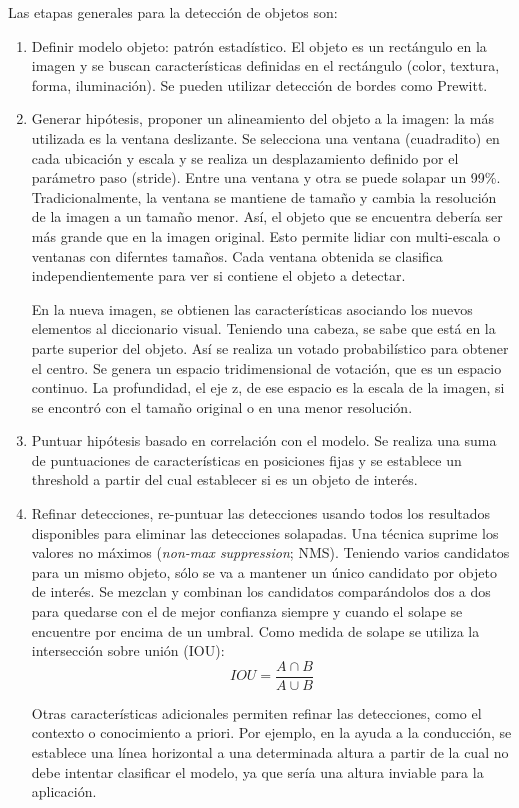 Las etapas generales para la detección de objetos son:
\begin{enumerate}
\item Definir modelo objeto: patrón estadístico. El objeto es un rectángulo en la imagen y se buscan características definidas en el rectángulo (color, textura, forma, iluminación). Se pueden utilizar detección de bordes como Prewitt.

\item Generar hipótesis, proponer un alineamiento del objeto a la imagen: la más utilizada es la ventana deslizante. Se selecciona una ventana (cuadradito) en cada ubicación y escala y se realiza un desplazamiento definido por el parámetro paso (stride). Entre una ventana y otra se puede solapar un 99\%. Tradicionalmente, la ventana se mantiene de tamaño y cambia la resolución de la imagen a un tamaño menor. Así, el objeto que se encuentra debería ser más grande que en la imagen original. Esto permite lidiar con multi-escala o ventanas con diferntes tamaños. Cada ventana obtenida se clasifica independientemente para ver si contiene el objeto a detectar.
 
En la nueva imagen, se obtienen las características asociando los nuevos elementos al diccionario visual. Teniendo una cabeza, se sabe que está en la parte superior del objeto. Así se realiza un votado probabilístico para obtener el centro. Se genera un espacio tridimensional de votación, que es un espacio continuo. La profundidad, el eje z, de ese espacio es la escala de la imagen, si se encontró con el tamaño original o en una menor resolución. 

\item Puntuar hipótesis basado en correlación con el modelo. Se realiza una suma de puntuaciones de características en posiciones fijas y se establece un threshold a partir del cual establecer si es un objeto de interés.

\item Refinar detecciones, re-puntuar las detecciones usando todos los resultados disponibles para eliminar las detecciones solapadas. Una técnica suprime los valores no máximos (\textit{non-max suppression}; NMS). Teniendo varios candidatos para un mismo objeto, sólo se va a mantener un único candidato por objeto de interés. Se mezclan y combinan los candidatos comparándolos dos a dos para quedarse con el de mejor confianza siempre y cuando el solape se encuentre por encima de un umbral. Como medida de solape se utiliza la intersección sobre unión (IOU): 
$$IOU = \frac{A \cap B}{A \cup B}$$

Otras características adicionales permiten refinar las detecciones, como el contexto o conocimiento a priori. Por ejemplo, en la ayuda a la conducción, se establece una línea horizontal a una determinada altura a partir de la cual no debe intentar clasificar el modelo, ya que sería una altura inviable para la aplicación.
\end{enumerate}

